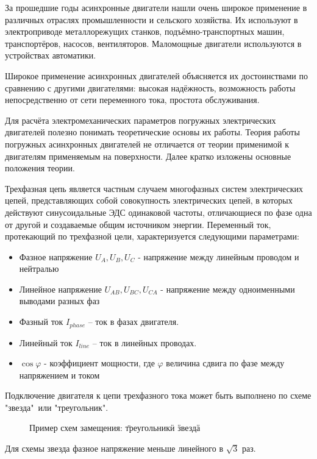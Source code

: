 За прошедшие годы асинхронные двигатели нашли очень широкое применение в различных отраслях промышленности и сельского хозяйства. Их используют в электроприводе металлорежущих станков, подъёмно-транспортных машин, транспортёров, насосов, вентиляторов. Маломощные двигатели используются в устройствах автоматики.

Широкое применение асинхронных двигателей объясняется их достоинствами по сравнению с другими двигателями: высокая надёжность, возможность работы непосредственно от сети переменного тока, простота обслуживания.

Для расчёта электромеханических параметров погружных электрических двигателей полезно понимать теоретические основы их работы. Теория работы погружных асинхронных двигателей не отличается от теории применимой к двигателям применяемым на поверхности. Далее кратко изложены основные положения теории. 

Трехфазная цепь является частным случаем многофазных систем электрических цепей, представляющих собой совокупность электрических цепей, в которых действуют синусоидальные ЭДС одинаковой частоты, отличающиеся по фазе одна от другой и создаваемые общим источником энергии.
Переменный ток, протекающий по трехфазной цели, характеризуется следующими параметрами:

\begin{itemize}
	\item Фазное напряжение $U_A, U_B, U_C $ - напряжение между линейным проводом и нейтралью
	\item Линейное напряжение $U_{AB}, U_{BC}, U_{CA} $ - напряжение между одноименными выводами разных фаз
	\item Фазный ток $I_{phase}$ – ток в фазах двигателя.
	\item Линейный ток $I_{line}$ – ток в линейных проводах.
	\item $ \cos \varphi $ - коэффициент мощности, где $ \varphi$ величина сдвига по фазе между напряжением и током 
\end{itemize}

Подключение двигателя к цепи трехфазного тока может быть выполнено по схеме "звезда"\ или "треугольник".

\begin{figure}[h!]
	\caption{Пример схем замещения: \"треугольник\" и \"звезда\"}
	\label{ris:electicity_triangle_star}
\end{figure}

Для схемы звезда фазное напряжение меньше линейного в $\sqrt{3}$ раз.

